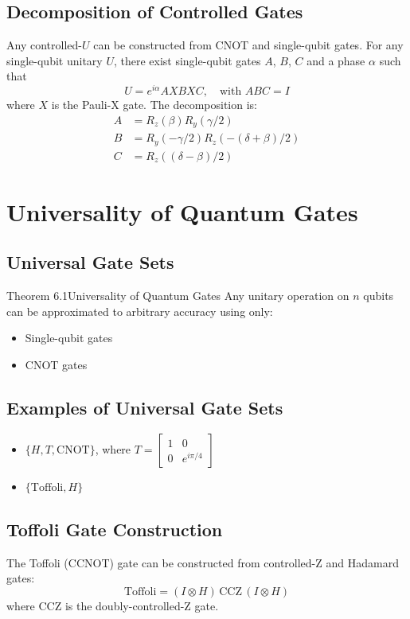 \documentclass{book}
\begin{document}
\subsection{Decomposition of Controlled Gates}
Any controlled-$U$ can be constructed from CNOT and single-qubit gates. For any single-qubit unitary $U$, there exist single-qubit gates $A$, $B$, $C$ and a phase $\alpha$ such that
\[
U = e^{i\alpha} A X B X C, \quad \text{with } ABC = I
\]
where $X$ is the Pauli-X gate. The decomposition is:
\begin{align*}
A &= R_z(\beta) R_y(\gamma/2) \\
B &= R_y(-\gamma/2) R_z(-(\delta+\beta)/2) \\
C &= R_z((\delta-\beta)/2)
\end{align*}

\section{Universality of Quantum Gates}

\subsection{Universal Gate Sets}
\begin{thmBox}{Theorem 6.1}{Universality of Quantum Gates}
Any unitary operation on $n$ qubits can be approximated to arbitrary accuracy using only:
\begin{itemize}
    \item Single-qubit gates
    \item CNOT gates
\end{itemize}
\end{thmBox}

\subsection{Examples of Universal Gate Sets}
\begin{itemize}
    \item $\{H, T, \text{CNOT}\}$, where $T = \begin{bmatrix} 1 & 0 \\ 0 & e^{i\pi/4} \end{bmatrix}$
    \item $\{\text{Toffoli}, H\}$
\end{itemize}

\subsection{Toffoli Gate Construction}
The Toffoli (CCNOT) gate can be constructed from controlled-Z and Hadamard gates:
\[
\text{Toffoli} = (I \otimes H)\,\text{CCZ}\,(I \otimes H)
\]
where CCZ is the doubly-controlled-Z gate.
\end{document}
